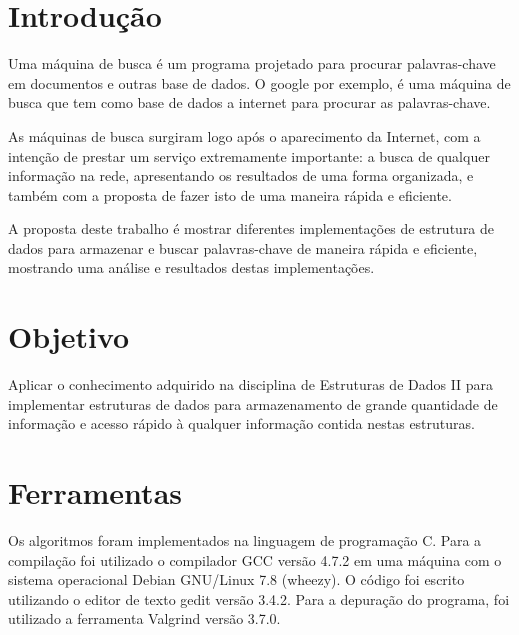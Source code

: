 \documentclass[a4paper,12pt]{article}
\begin{document}

\newpage






\section{Introdução} %

Uma máquina de busca é um programa projetado para procurar palavras-chave em documentos e outras base de dados. O google 
por exemplo, é uma máquina de busca que tem como base de dados a internet para procurar as palavras-chave.

As máquinas de busca surgiram logo após o aparecimento da Internet, com a intenção de prestar um serviço 
extremamente importante: a busca de qualquer informação na rede, apresentando os resultados de uma forma 
organizada, e também com a proposta de fazer isto de uma maneira rápida e eficiente. 

A proposta deste trabalho é mostrar diferentes implementações de estrutura de dados para armazenar e buscar palavras-chave 
de maneira rápida e eficiente, mostrando uma análise e resultados destas implementações.


\section{Objetivo}
Aplicar o conhecimento adquirido na disciplina de Estruturas de Dados II para implementar estruturas de dados 
para armazenamento de grande quantidade de informação e acesso rápido à qualquer informação contida 
nestas estruturas.

\section{Ferramentas}
Os algoritmos foram implementados na linguagem de programação C. Para a compilação foi 
utilizado o compilador GCC versão 4.7.2 em uma máquina com o sistema operacional Debian 
GNU/Linux 7.8 (wheezy).
O código foi escrito utilizando o editor de texto gedit versão 3.4.2.
Para a depuração do programa, foi utilizado a ferramenta Valgrind versão 3.7.0.
\end{document}
